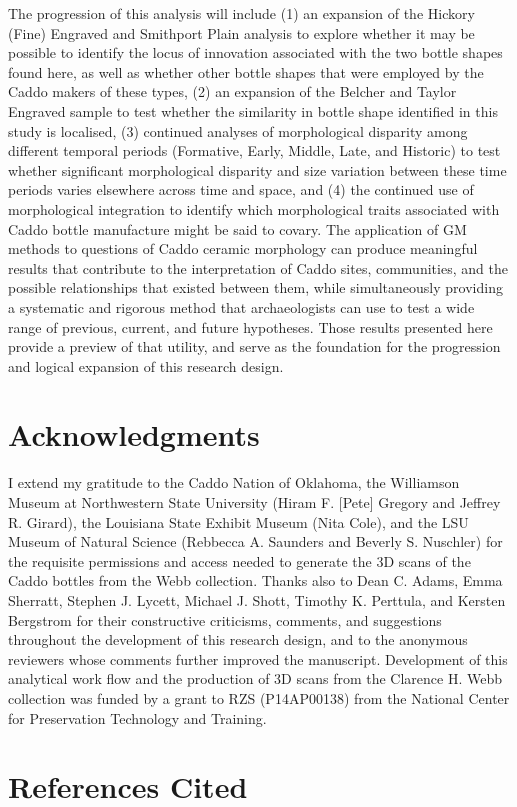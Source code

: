 \documentclass[review]{elsarticle}
\begin{document}
The progression of this analysis will include (1) an expansion of the Hickory (Fine) Engraved and Smithport Plain analysis to explore whether it may be possible to identify the locus of innovation associated with the two bottle shapes found here, as well as whether other bottle shapes that were employed by the Caddo makers of these types, (2) an expansion of the Belcher and Taylor Engraved sample to test whether the similarity in bottle shape identified in this study is localised, (3) continued analyses of morphological disparity among different temporal periods (Formative, Early, Middle, Late, and Historic) to test whether significant morphological disparity and size variation between these time periods varies elsewhere across time and space, and (4) the continued use of morphological integration to identify which morphological traits associated with Caddo bottle manufacture might be said to covary. The application of GM methods to questions of Caddo ceramic morphology can produce meaningful results that contribute to the interpretation of Caddo sites, communities, and the possible relationships that existed between them, while simultaneously providing a systematic and rigorous method that archaeologists can use to test a wide range of previous, current, and future hypotheses. Those results presented here provide a preview of that utility, and serve as the foundation for the progression and logical expansion of this research design. 

\section*{Acknowledgments}

I extend my gratitude to the Caddo Nation of Oklahoma, the Williamson Museum at Northwestern State University (Hiram F. [Pete] Gregory and Jeffrey R. Girard), the Louisiana State Exhibit Museum (Nita Cole), and the LSU Museum of Natural Science (Rebbecca A. Saunders and Beverly S. Nuschler) for the requisite permissions and access needed to generate the 3D scans of the Caddo bottles from the Webb collection. Thanks also to Dean C. Adams, Emma Sherratt, Stephen J. Lycett, Michael J. Shott, Timothy K. Perttula, and Kersten Bergstrom for their constructive criticisms, comments, and suggestions throughout the development of this research design, and to the anonymous reviewers whose comments further improved the manuscript. Development of this analytical work flow and the production of 3D scans from the Clarence H. Webb collection was funded by a grant to RZS (P14AP00138) from the National Center for Preservation Technology and Training.

\section*{References Cited}


\end{document}
